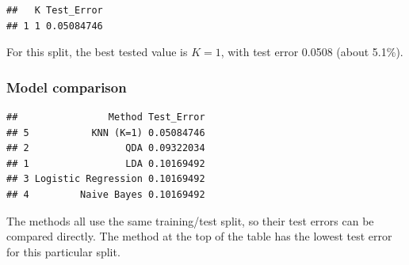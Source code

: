 \documentclass[
]{article}
\newenvironment{Shaded}{\begin{snugshade}}{\end{snugshade}}
\newcommand{\AttributeTok}[1]{\textcolor[rgb]{0.13,0.29,0.53}{#1}}
\newcommand{\FunctionTok}[1]{\textcolor[rgb]{0.13,0.29,0.53}{\textbf{#1}}}
\newcommand{\NormalTok}[1]{#1}
\newcommand{\OtherTok}[1]{\textcolor[rgb]{0.56,0.35,0.01}{#1}}
\newcommand{\SpecialCharTok}[1]{\textcolor[rgb]{0.81,0.36,0.00}{\textbf{#1}}}
\newcommand{\StringTok}[1]{\textcolor[rgb]{0.31,0.60,0.02}{#1}}
\begin{document}
\begin{Shaded}
\end{Shaded}

\begin{verbatim}
##   K Test_Error
## 1 1 0.05084746
\end{verbatim}

For this split, the best tested value is \(K=1\), with test error 0.0508
(about 5.1\%).

\subsubsection{Model comparison}\label{model-comparison}

\begin{Shaded}
\end{Shaded}

\begin{verbatim}
##                Method Test_Error
## 5           KNN (K=1) 0.05084746
## 2                 QDA 0.09322034
## 1                 LDA 0.10169492
## 3 Logistic Regression 0.10169492
## 4         Naive Bayes 0.10169492
\end{verbatim}

The methods all use the same training/test split, so their test errors
can be compared directly. The method at the top of the table has the
lowest test error for this particular split.
\end{document}
